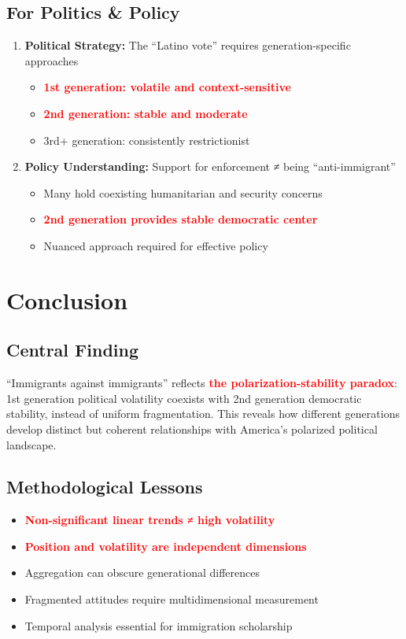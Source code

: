 \documentclass[11pt,letterpaper]{article}
\begin{document}
\subsection{For Politics \& Policy}
\begin{enumerate}
    \item \textbf{Political Strategy:} The ``Latino vote'' requires generation-specific approaches
        \begin{itemize}
            \item \textcolor{red}{\textbf{1st generation: volatile and context-sensitive}}
            \item \textcolor{red}{\textbf{2nd generation: stable and moderate}}
            \item 3rd+ generation: consistently restrictionist
        \end{itemize}
    
    \item \textbf{Policy Understanding:} Support for enforcement ≠ being ``anti-immigrant''
        \begin{itemize}
            \item Many hold coexisting humanitarian and security concerns
            \item \textcolor{red}{\textbf{2nd generation provides stable democratic center}}
            \item Nuanced approach required for effective policy
        \end{itemize}
\end{enumerate}

\section{Conclusion}

\subsection{Central Finding}
``Immigrants against immigrants'' reflects \textbf{\textcolor{red}{the polarization-stability paradox}}: 1st generation political volatility coexists with 2nd generation democratic stability, instead of uniform fragmentation. This reveals how different generations develop distinct but coherent relationships with America's polarized political landscape.

\subsection{Methodological Lessons}
\begin{itemize}
    \item \textcolor{red}{\textbf{Non-significant linear trends ≠ high volatility}}
    \item \textcolor{red}{\textbf{Position and volatility are independent dimensions}}
    \item Aggregation can obscure generational differences
    \item Fragmented attitudes require multidimensional measurement
    \item Temporal analysis essential for immigration scholarship
\end{itemize}
\end{document}
